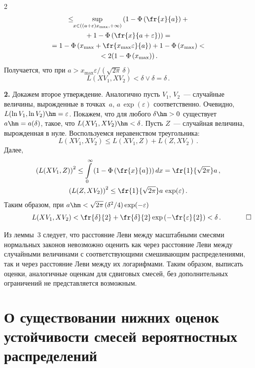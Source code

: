 \begin{multicols}{2}
\noindent
\begin{multline*}
{}\le
      \!\!\sup\limits_{x \in ((a+\varepsilon)x_{\max},+\infty)}
      \left( 1 - \Phi\left(\fr{x}{a}\right)   +{}\right.\\
\left.      {}+
      1 - \Phi\left(\fr{x }{a+\varepsilon} \right)
      \right)=      {}\\
      {}      =   1 - \Phi\left(x_{\max} + \fr{ x_{\max} \varepsilon  }{   a  }\right)   +
      1 - \Phi\left(  x_{\max}  \right)<{}\\
      {}<
      2( 1 - \Phi\left( x_{\max}   \right) )\,.
\end{multline*}
      Получается, что при
      $
      a >  x_{\max}\varepsilon/(\sqrt{2\pi}\,\delta)  $
      $$
       L(X V_1, X V_2) <   \delta   \vee \delta = \delta\,.
            $$

\noindent
\textbf{2.} Докажем второе утверждение. Аналогично пусть  
    $V_1$, $V_2$~--- случайные величины, вырожденные в точках~$a$,
      $a\,\exp(\varepsilon)$ соответственно.
      Очевидно, $L( \ln V_1, \ln V_2) \hm= \varepsilon$. 
      Покажем, что для любого $\delta\hm>0$ существует $a \hm= a(\delta)$, такое, что
      $L(X V_1, X V_2)\hm <\delta$. Пусть $Z$~--- 
      случайная величина, вырожденная в нуле. Воспользуемся неравенством треугольника:
      $$
      L(X V_1, X V_2)\le L(X V_1,Z) +  L(Z, X V_2)\,.
      $$
      Далее,
      \begin{gather*}
      \left(L(X V_1,Z)\right)^2\le
      \int\limits_0^{\infty}
      \left(1 - \Phi\left(\fr{x}{a}
      \right)\right)dx  = \fr{1}{\sqrt{2\pi } }a\,, \\
      \left( L(Z, X V_2)\right)^2\le
       \fr{1}{\sqrt{2\pi } }a\,\exp(\varepsilon)\,.
      \end{gather*}
      Таким образом, при $ a \hm<\sqrt{2\pi }\, (\delta^2/4) \exp(-\varepsilon)$
      $$
       ~~~~~~~~~~~~L(X V_1, X V_2) <  \fr{\delta}{2} +
       \fr{ \delta}{2}\exp\left(-\fr{\varepsilon}{2}\right)
       < \delta\,.~~~~~~~~~~~\square
       $$



Из леммы~3 следует, что расстояние Леви между масштабными смесями
нормальных законов невозможно оценить как через расстояние Леви
между случайными величинами с соответствующими смешивающим
распределениями, так и через расстояние Леви между их логарифмами.
Таким образом, выписать оценки, аналогичные оценкам для сдвиговых
смесей, без дополнительных ограничений не представляется возможным.

\section{О существовании нижних оценок устойчивости
смесей вероятностных распределений}


\end{multicols}
